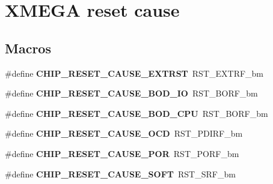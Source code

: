 \hypertarget{group__xmega__reset__cause__group}{\section{X\-M\-E\-G\-A reset cause}
\label{group__xmega__reset__cause__group}
}
\subsection*{Macros}
\begin{DoxyCompactItemize}
\item 
\hypertarget{group__xmega__reset__cause__group_ga6a5a214585cf1f2ce047e2766a7b3209}{\#define {\bfseries C\-H\-I\-P\-\_\-\-R\-E\-S\-E\-T\-\_\-\-C\-A\-U\-S\-E\-\_\-\-E\-X\-T\-R\-S\-T}~R\-S\-T\-\_\-\-E\-X\-T\-R\-F\-\_\-bm}\label{group__xmega__reset__cause__group_ga6a5a214585cf1f2ce047e2766a7b3209}

\item 
\hypertarget{group__xmega__reset__cause__group_ga110cad44a62c97b515be08efecc1fcb1}{\#define {\bfseries C\-H\-I\-P\-\_\-\-R\-E\-S\-E\-T\-\_\-\-C\-A\-U\-S\-E\-\_\-\-B\-O\-D\-\_\-\-I\-O}~R\-S\-T\-\_\-\-B\-O\-R\-F\-\_\-bm}\label{group__xmega__reset__cause__group_ga110cad44a62c97b515be08efecc1fcb1}

\item 
\hypertarget{group__xmega__reset__cause__group_gac08552174339c2c3236c130bde8370ab}{\#define {\bfseries C\-H\-I\-P\-\_\-\-R\-E\-S\-E\-T\-\_\-\-C\-A\-U\-S\-E\-\_\-\-B\-O\-D\-\_\-\-C\-P\-U}~R\-S\-T\-\_\-\-B\-O\-R\-F\-\_\-bm}\label{group__xmega__reset__cause__group_gac08552174339c2c3236c130bde8370ab}

\item 
\hypertarget{group__xmega__reset__cause__group_gab9cc8b90f6b2ae90ab45eb3f0e0e88ae}{\#define {\bfseries C\-H\-I\-P\-\_\-\-R\-E\-S\-E\-T\-\_\-\-C\-A\-U\-S\-E\-\_\-\-O\-C\-D}~R\-S\-T\-\_\-\-P\-D\-I\-R\-F\-\_\-bm}\label{group__xmega__reset__cause__group_gab9cc8b90f6b2ae90ab45eb3f0e0e88ae}

\item 
\hypertarget{group__xmega__reset__cause__group_ga0d72a97ef0e51c1686a79b54c77abdad}{\#define {\bfseries C\-H\-I\-P\-\_\-\-R\-E\-S\-E\-T\-\_\-\-C\-A\-U\-S\-E\-\_\-\-P\-O\-R}~R\-S\-T\-\_\-\-P\-O\-R\-F\-\_\-bm}\label{group__xmega__reset__cause__group_ga0d72a97ef0e51c1686a79b54c77abdad}

\item 
\hypertarget{group__xmega__reset__cause__group_ga1573b6b155bcada6f48bbad42eab7afd}{\#define {\bfseries C\-H\-I\-P\-\_\-\-R\-E\-S\-E\-T\-\_\-\-C\-A\-U\-S\-E\-\_\-\-S\-O\-F\-T}~R\-S\-T\-\_\-\-S\-R\-F\-\_\-bm}\label{group__xmega__reset__cause__group_ga1573b6b155bcada6f48bbad42eab7afd}


\end{DoxyCompactItemize}
